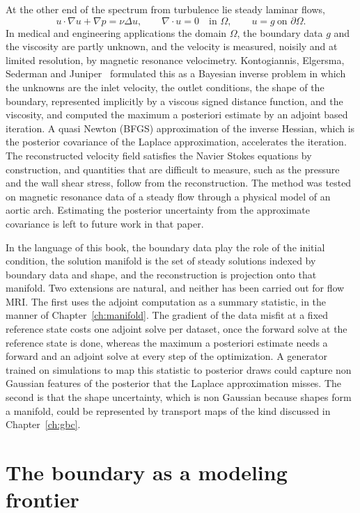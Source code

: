 At the other end of the spectrum from turbulence lie steady laminar flows,
\[
u\cdot\nabla u+\nabla p = \nu\Delta u,\qquad\nabla\cdot u = 0\quad\text{in }\Omega,\qquad u = g\ \text{on }\partial\Omega.
\]
In medical and engineering applications the domain $\Omega$, the boundary data $g$ and the viscosity are partly unknown, and the velocity is measured, noisily and at limited resolution, by magnetic resonance velocimetry. Kontogiannis, Elgersma, Sederman and Juniper~\cite{kontogiannis2025} formulated this as a Bayesian inverse problem in which the unknowns are the inlet velocity, the outlet conditions, the shape of the boundary, represented implicitly by a viscous signed distance function, and the viscosity, and computed the maximum a posteriori estimate by an adjoint based iteration. A quasi Newton (BFGS) approximation of the inverse Hessian, which is the posterior covariance of the Laplace approximation, accelerates the iteration. The reconstructed velocity field satisfies the Navier Stokes equations by construction, and quantities that are difficult to measure, such as the pressure and the wall shear stress, follow from the reconstruction. The method was tested on magnetic resonance data of a steady flow through a physical model of an aortic arch. Estimating the posterior uncertainty from the approximate covariance is left to future work in that paper.

In the language of this book, the boundary data play the role of the initial condition, the solution manifold is the set of steady solutions indexed by boundary data and shape, and the reconstruction is projection onto that manifold. Two extensions are natural, and neither has been carried out for flow MRI. The first uses the adjoint computation as a summary statistic, in the manner of Chapter~\ref{ch:manifold}. The gradient of the data misfit at a fixed reference state costs one adjoint solve per dataset, once the forward solve at the reference state is done, whereas the maximum a posteriori estimate needs a forward and an adjoint solve at every step of the optimization. A generator trained on simulations to map this statistic to posterior draws could capture non Gaussian features of the posterior that the Laplace approximation misses. The second is that the shape uncertainty, which is non Gaussian because shapes form a manifold, could be represented by transport maps of the kind discussed in Chapter~\ref{ch:gbc}.

\section{The boundary as a modeling frontier}

